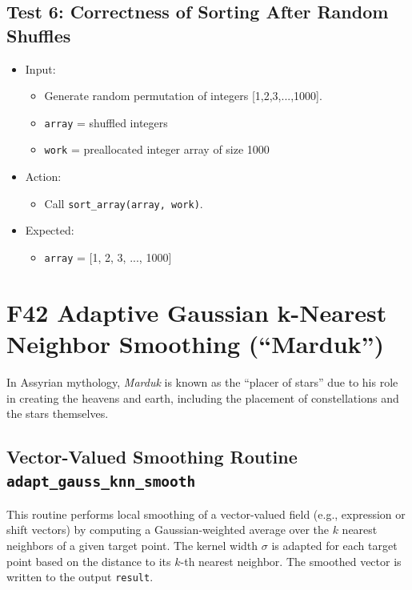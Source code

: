 \documentclass{article}
\begin{document}
\subsection{Test 6: Correctness of Sorting After Random Shuffles}

\begin{itemize}
    \item Input:
    \begin{itemize}
        \item Generate random permutation of integers [1,2,3,...,1000].
        \item \texttt{array} = shuffled integers
        \item \texttt{work} = preallocated integer array of size 1000
    \end{itemize}
    \item Action:
    \begin{itemize}
        \item Call \texttt{sort\_array(array, work)}.
    \end{itemize}
    \item Expected:
    \begin{itemize}
        \item \texttt{array} = [1, 2, 3, ..., 1000]
    \end{itemize}
\end{itemize}


\section{F42 Adaptive Gaussian k-Nearest Neighbor Smoothing (``Marduk'')}

\begin{displayquote}
In Assyrian mythology, \emph{Marduk} is known as the ``placer of stars''
due to his role in creating the heavens and earth, including the placement of
constellations and the stars themselves.
\end{displayquote}

\subsection{Vector-Valued Smoothing Routine \texttt{adapt\_gauss\_knn\_smooth}}

This routine performs local smoothing of a vector-valued field (e.g., expression or shift vectors) by computing a Gaussian-weighted average over the $k$ nearest neighbors of a given target point. The kernel width $\sigma$ is adapted for each target point based on the distance to its $k$-th nearest neighbor. The smoothed vector is written to the output \texttt{result}.
\end{document}

